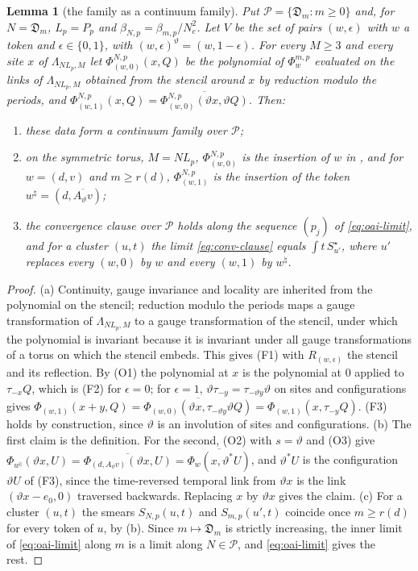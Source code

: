 \documentclass[11pt,a4paper]{amsart}
\newtheorem{lemma}[theorem]{Lemma}
\theoremstyle{definition}
\theoremstyle{remark}
\numberwithin{equation}{section}
\newcommand{\Lp}{L_p}                      %
\newcommand{\betaNp}{\beta_{N,p}}          %
\newcommand{\Den}{\mathfrak D}            %
\begin{document}
\begin{lemma}[the family as a continuum family]\label{lem:oai-family}
Put $\mathcal P=\{\Den_m:m\ge0\}$ and, for $N=\Den_m$, $\Lp=P_p$ and $\betaNp=\beta_{m,p}/N_c^2$. Let $V$ be the set of pairs $(w,\epsilon)$ with $w$ a token and $\epsilon\in\{0,1\}$, with $(w,\epsilon)^\vartheta=(w,1-\epsilon)$. For every $M\ge3$ and every site $x$ of $\Lambda_{N\Lp,M}$ let $\Phi^{N,p}_{(w,0)}(x,Q)$ be the polynomial of $\Phi^{m,p}_w$ evaluated on the links of $\Lambda_{N\Lp,M}$ obtained from the stencil around $x$ by reduction modulo the periods, and $\Phi^{N,p}_{(w,1)}(x,Q)=\overline{\Phi^{N,p}_{(w,0)}(\vartheta x,\vartheta Q)}$. Then:
\begin{enumerate}[label=(\alph*),leftmargin=2.2em]
\item these data form a continuum family over $\mathcal P$;
\item on the symmetric torus, $M=N\Lp$, $\Phi^{N,p}_{(w,0)}$ is the insertion of $w$ in \cite{openaiym}, and for $w=(d,v)$ and $m\ge r(d)$, $\Phi^{N,p}_{(w,1)}$ is the insertion of the token $w^\natural=(d,\overline{A_\vartheta v})$;
\item the convergence clause over $\mathcal P$ holds along the sequence $(p_j)$ of \eqref{eq:oai-limit}, and for a cluster $(u,t)$ the limit \eqref{eq:conv-clause} equals $\int t\,S^\star_{u'}$, where $u'$ replaces every $(w,0)$ by $w$ and every $(w,1)$ by $w^\natural$.
\end{enumerate}
\end{lemma}

\begin{proof}
(a) Continuity, gauge invariance and locality are inherited from the polynomial on the stencil; reduction modulo the periods maps a gauge transformation of $\Lambda_{N\Lp,M}$ to a gauge transformation of the stencil, under which the polynomial is invariant because it is invariant under all gauge transformations of a torus on which the stencil embeds. This gives (F1) with $R_{(w,\epsilon)}$ the stencil and its reflection. By (O1) the polynomial at $x$ is the polynomial at $0$ applied to $\tau_{-x}Q$, which is (F2) for $\epsilon=0$; for $\epsilon=1$, $\vartheta\tau_{-y}=\tau_{-\vartheta y}\vartheta$ on sites and configurations gives $\Phi_{(w,1)}(x+y,Q)=\overline{\Phi_{(w,0)}(\vartheta x,\tau_{-\vartheta y}\vartheta Q)}=\Phi_{(w,1)}(x,\tau_{-y}Q)$. (F3) holds by construction, since $\vartheta$ is an involution of sites and configurations. (b) The first claim is the definition. For the second, (O2) with $s=\vartheta$ and (O3) give $\Phi_{w^\natural}(\vartheta x,U)=\overline{\Phi_{(d,A_\vartheta v)}(\vartheta x,U)}=\overline{\Phi_w(x,\vartheta^*U)}$, and $\vartheta^*U$ is the configuration $\vartheta U$ of (F3), since the time-reversed temporal link from $\vartheta x$ is the link $(\vartheta x-e_0,0)$ traversed backwards. Replacing $x$ by $\vartheta x$ gives the claim. (c) For a cluster $(u,t)$ the smears $S_{N,p}(u,t)$ and $S_{m,p}(u',t)$ coincide once $m\ge r(d)$ for every token of $u$, by (b). Since $m\mapsto \Den_m$ is strictly increasing, the inner limit of \eqref{eq:oai-limit} along $m$ is a limit along $N\in\mathcal P$, and \eqref{eq:oai-limit} gives the rest.
\end{proof}
\end{document}
